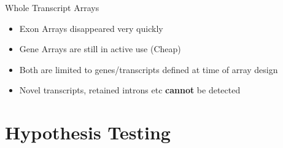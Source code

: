 \documentclass[aspectratio=169,11pt]{beamer}
\newcommand\blfootnote[1]{%
  \begingroup
  \renewcommand\thefootnote{}\footnote{#1}%
  \addtocounter{footnote}{-1}%
  \endgroup
}
\begin{document}
\begin{frame}{Whole Transcript Arrays}

	\begin{itemize}
		\item Exon Arrays disappeared very quickly
		\item Gene Arrays are still in active use (Cheap)
		\item Both are limited to genes/transcripts defined at time of array design
		\item Novel transcripts, retained introns etc \textbf{cannot} be detected 
	\end{itemize}

\end{frame}

%
%
%	
%
%
%
%
%

\section{Hypothesis Testing}
\end{document}
